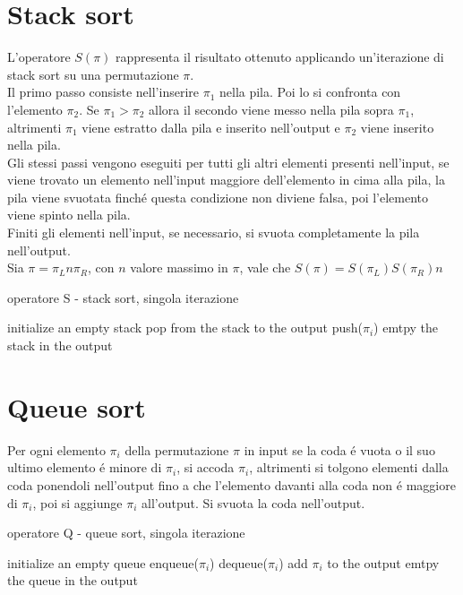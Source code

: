 \section*{Stack sort}
L'operatore $S(\pi)$ rappresenta il risultato ottenuto applicando un'iterazione di stack sort su una permutazione $\pi$.\\
Il primo passo consiste nell'inserire $\pi_1$ nella pila. Poi lo si confronta con l'elemento $\pi_2$. Se $\pi_1>\pi_2$ allora il secondo viene messo nella pila sopra $\pi_1$, altrimenti $\pi_1$ viene estratto dalla pila e inserito nell'output e $\pi_2$ viene inserito nella pila.\\
Gli stessi passi vengono eseguiti per tutti gli altri elementi presenti nell'input, se viene trovato un elemento nell'input maggiore dell'elemento in cima alla pila, la pila viene svuotata finch\'e questa condizione non diviene falsa, poi l'elemento viene spinto nella pila.\\
Finiti gli elementi nell'input, se necessario, si svuota completamente la pila nell'output.\cite{limbrief}\\
Sia $\pi = \pi_Ln\pi_R$, con $n$ valore massimo in $\pi$, vale che $S(\pi)=S(\pi_L)S(\pi_R)n$
\begin{algorithm}[H]
   \caption{operatore S - stack sort, singola iterazione}
\begin{algorithmic}[1]
\State initialize an empty stack
   \State pop from the stack to the output
   \EndWhile
   \State push($\pi_i$)
   \EndFor
   \State emtpy the stack in the output
\end{algorithmic}
\end{algorithm}
\section*{Queue sort}
Per ogni elemento $\pi_i$ della permutazione $\pi$ in input se la coda \'e vuota o il suo ultimo elemento \'e minore di $\pi_i$, si accoda $\pi_i$, altrimenti si tolgono elementi dalla coda ponendoli nell'output fino a che l'elemento davanti  alla coda non \'e maggiore di $\pi_i$, poi si aggiunge $\pi_i$ all'output. Si svuota la coda nell'output\cite{magnusson2013sorting}. 
\begin{algorithm}[H]
   \caption{operatore Q - queue sort, singola iterazione}
\begin{algorithmic}[1]
\State initialize an empty queue
\State enqueue($\pi_i$)
\Else
{}
\State dequeue($\pi_i$)
\EndWhile
\State add $\pi_i$ to the output
\EndIf
\EndFor
\State emtpy the queue in the output
\end{algorithmic}
\end{algorithm}
